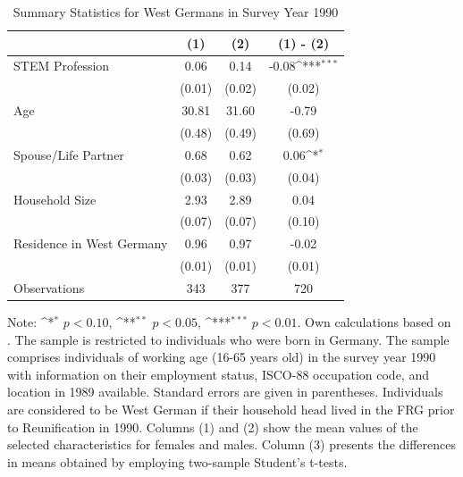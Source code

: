 \documentclass[a4paper, oneside, hyperfootnotes = false]{article}
\def\sym#1{\ifmmode^{#1}\else\(^{#1}\)\fi}
\begin{document}
{\begin{table}[ht]
\begin{center}
	\end{center}
\end{table}

\begin{table}[ht]
	\caption{Summary Statistics for West Germans in Survey Year 1990}
	\label{tab:descr_summary_west}
	\begin{center}
		\begin{tabular}{l*{3}{c}}
			\toprule
			& (1) & (2) & (1) - (2) \\
			\midrule
			STEM Profession & 0.06  & 0.14 &  -0.08\sym{***}      \\
			&   (0.01)  & (0.02) & (0.02) \\
			\addlinespace
			Age         & 30.81     &  31.60   &    -0.79     \\
			&     (0.48) &        (0.49)         &      (0.69) \\
			\addlinespace
			Spouse/Life Partner & 0.68       &  0.62   &     0.06\sym{*}      \\
			&      (0.03)&          (0.03)&         (0.04) \\
			\addlinespace
			Household Size      &  2.93   &  2.89   &    0.04       \\
			&          (0.07)&       (0.07)        &      (0.10)\\
			\addlinespace
			Residence in West Germany& 0.96    &  0.97   &    -0.02        \\
			&         (0.01) &       (0.01)&  (0.01)\\
			\midrule
			Observations        &        343 &     377     &       720                \\
			\bottomrule
		\end{tabular}
		
		\vspace{2mm}
		
		\parbox{10cm}{
			\linespread{1}\footnotesize Note: \sym{*} \(p<0.10\), \sym{**} \(p<0.05\), \sym{***} \(p<0.01\). Own calculations based on \cite{SOEP2023}. The sample is restricted to individuals who were born in Germany. The sample comprises individuals of working age (16-65 years old) in the survey year 1990 with information on their employment status, ISCO-88 occupation code, and location in 1989 available. Standard errors are given in parentheses. Individuals are considered to be West German if their household head lived in the FRG prior to Reunification in 1990. Columns (1) and (2) show the mean values of the selected characteristics for females and males. Column (3) presents the differences in means obtained by employing two-sample Student's t-tests.}
		

\end{center}
\end{table}}
\end{document}
